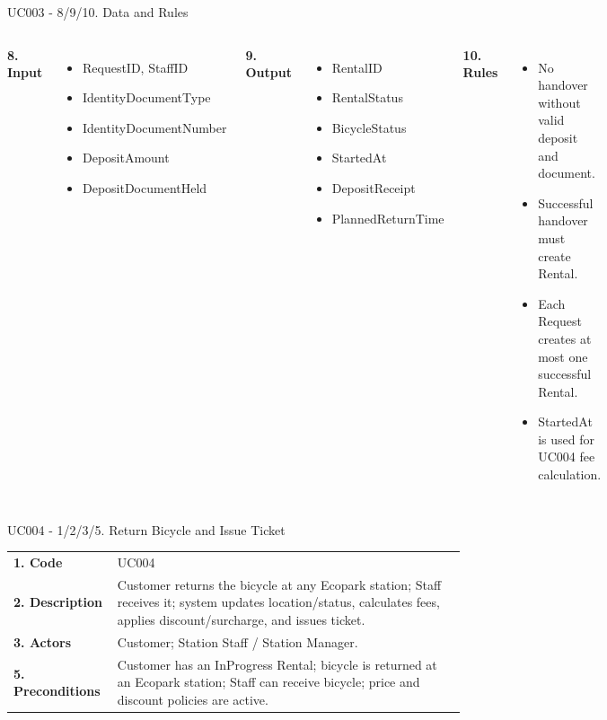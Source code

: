 \documentclass[aspectratio=169,10pt]{beamer}
\newcommand{\tightitems}{\setlength{\itemsep}{2pt}\setlength{\parskip}{0pt}}
\begin{document}
\begin{frame}{UC003 - 8/9/10. Data and Rules}
\footnotesize
\begin{columns}[T,onlytextwidth]
\textbf{8. Input}
\begin{itemize}\tightitems
  \item RequestID, StaffID
  \item IdentityDocumentType
  \item IdentityDocumentNumber
  \item DepositAmount
  \item DepositDocumentHeld
\end{itemize}
\textbf{9. Output}
\begin{itemize}\tightitems
  \item RentalID
  \item RentalStatus
  \item BicycleStatus
  \item StartedAt
  \item DepositReceipt
  \item PlannedReturnTime
\end{itemize}
\textbf{10. Rules}
\begin{itemize}\tightitems
  \item No handover without valid deposit and document.
  \item Successful handover must create Rental.
  \item Each Request creates at most one successful Rental.
  \item StartedAt is used for UC004 fee calculation.
\end{itemize}
\end{columns}
\end{frame}

\begin{frame}{UC004 - 1/2/3/5. Return Bicycle and Issue Ticket}
\small
\begin{tabular}{p{}p{}}
\toprule
\textbf{1. Code} & UC004 \\
\textbf{2. Description} & Customer returns the bicycle at any Ecopark station; Staff receives it; system updates location/status, calculates fees, applies discount/surcharge, and issues ticket. \\
\textbf{3. Actors} & Customer; Station Staff / Station Manager. \\
\textbf{5. Preconditions} & Customer has an InProgress Rental; bicycle is returned at an Ecopark station; Staff can receive bicycle; price and discount policies are active. \\
\bottomrule
\end{tabular}
\end{frame}
\end{document}
